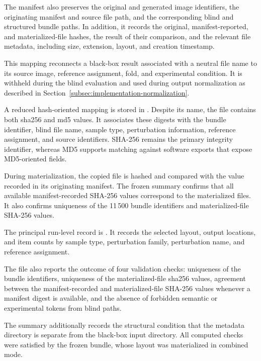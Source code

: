 The manifest also preserves the original and generated image identifiers, the
originating manifest and source file path, and the corresponding blind and
structured bundle paths. In addition, it records the original,
manifest-reported, and materialized-file hashes, the result of their comparison,
and the relevant file metadata, including size, extension, layout, and creation
timestamp.

This mapping reconnects a black-box result associated with a neutral file name
to its source image, reference assignment, fold, and experimental condition.
It is withheld during the blind evaluation and used during output normalization
as described in
Section~\ref{subsec:implementation-normalization}.

A reduced hash-oriented mapping is stored in
.
Despite its name, the file contains both \gls{sha256} and \gls{md5} values. It
associates these digests with the bundle identifier, blind file name, sample
type, perturbation information, reference assignment, and source identifiers.
SHA-256 remains the primary integrity identifier, whereas MD5 supports matching
against software exports that expose MD5-oriented fields.

During materialization, the copied file is hashed and compared with the value
recorded in its originating manifest. The frozen summary confirms that all
available manifest-recorded SHA-256 values correspond to the materialized
files. It also confirms uniqueness of the 11\,500 bundle identifiers and
materialized-file SHA-256 values.

The principal run-level record is
.
It records the selected layout, output locations, and item counts by sample type,
perturbation family, perturbation name, and reference assignment.

The file also reports the outcome of four validation checks: uniqueness of the
bundle identifiers, uniqueness of the materialized-file \gls{sha256} values,
agreement between the manifest-recorded and materialized-file SHA-256 values
whenever a manifest digest is available, and the absence of forbidden semantic
or experimental tokens from blind paths.

The summary additionally records the structural condition that the metadata
directory is separate from the black-box input directory. All computed checks
were satisfied by the frozen bundle, whose layout was materialized in combined
mode.

